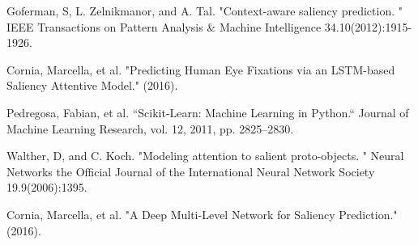 \documentclass[letterpaper, 10 pt, conference]{ieeeconf}  %
\begin{document}
\begin{thebibliography}{00}
 Goferman, S, L. Zelnikmanor, and A. Tal. "Context-aware saliency prediction. " IEEE Transactions on Pattern Analysis \& Machine Intelligence 34.10(2012):1915-1926.

 Cornia, Marcella, et al. "Predicting Human Eye Fixations via an LSTM-based Saliency Attentive Model." (2016).

 Pedregosa, Fabian, et al. ``Scikit-Learn: Machine Learning in Python.`` Journal of Machine Learning Research, vol. 12, 2011, pp. 2825--2830.

 Walther, D, and C. Koch. "Modeling attention to salient proto-objects. " Neural Networks the Official Journal of the International Neural Network Society 19.9(2006):1395.

 Cornia, Marcella, et al. "A Deep Multi-Level Network for Saliency Prediction." (2016).

\end{thebibliography}
\end{document}
